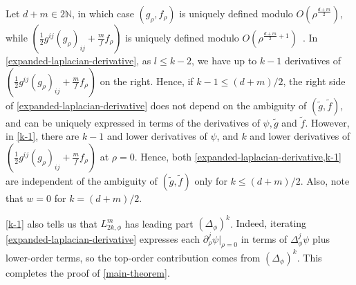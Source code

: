 \documentclass{amsart}
\begin{document}
Let $d+m\in 2\mathbb{N}$, in which case $(g_\rho,f_\rho)$ is uniquely defined modulo $O(\rho^{\frac{d+m}{2}})$, while $( \frac{1}{2}g^{ij}(g_\rho)_{ij}+\frac{m}{f}f_\rho)$ is uniquely defined modulo $O(\rho^{\frac{d+m}{2}+1})$~\cite{CaseKhaitan2022}. In \cref{expanded-laplacian-derivative}, as $l\leq k-2$, we have {up to} $k-1$ derivatives of $( \frac{1}{2}g^{ij}(g_\rho)_{ij}+\frac{m}{f}f_\rho)$ on the right. Hence, if $k-1\leq (d+m)/2$, the right side of \cref{expanded-laplacian-derivative} does not depend on the ambiguity of $(\widetilde{g},\widetilde{f})$, and can be uniquely expressed in terms of the derivatives of $\psi,\widetilde{g}$ and $\widetilde{f}$. However, in \cref{k-1}, there are $k-1$ and lower derivatives of $\psi$, and $k$ and lower derivatives of $( \frac{1}{2}g^{ij}(g_\rho)_{ij}+\frac{m}{f}f_\rho)$ at $\rho=0$. Hence, both \cref{expanded-laplacian-derivative,k-1} are independent of the ambiguity of $(\widetilde{g},\widetilde{f})$ only for $k\leq (d+m)/2$. Also, note that $w=0$ for $k=(d+m)/2$.  

\cref{k-1} also tells us that $L_{2k,\phi}^m$ has leading part $(\Delta_\phi)^k$. {Indeed, iterating \cref{expanded-laplacian-derivative} expresses each $\partial_\rho^{j}\psi|_{\rho=0}$ in terms of $\Delta_\phi^{j}\psi$ plus lower-order terms, so the top-order contribution comes from $(\Delta_\phi)^k$.} This completes the proof of \cref{main-theorem}.



\end{document}

